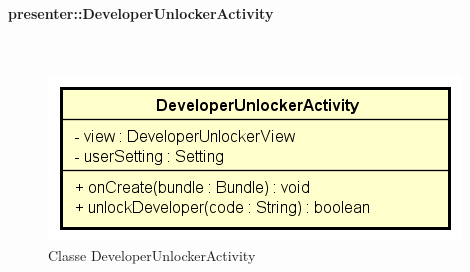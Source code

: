 \documentclass[../DefinizioneDiProdotto.tex]{subfiles}
\begin{document}
\paragraph{presenter::DeveloperUnlockerActivity}
\
\begin{figure}[H]
	\centering
	\includegraphics[width=\maxwidth]{img/DeveloperUnlockerActivity.png}
	\caption{Classe DeveloperUnlockerActivity}\label{fig:presenter::DeveloperUnlockerActivity} 
\end{figure}
\end{document}
